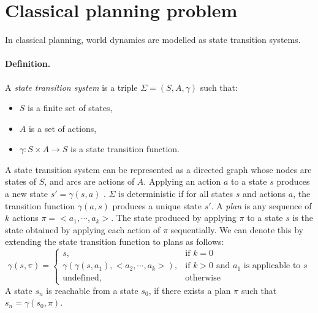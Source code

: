 \section{Classical planning problem}\label{subsec:Classical planning problem}
In classical planning, world dynamics are modelled as state transition systems.

\paragraph{Definition.}
A \textit{state transition system} is a triple $\Sigma = (S, A, \gamma)$ such that:
\begin{itemize}
\item $S$ is a finite set of states,
\item $A$ is a set of actions,
\item $\gamma : S \times A \rightarrow S$ is a state transition function.
\end{itemize}

\noindent A state transition system can be represented as a directed graph whose nodes are states of $S$, and arcs are actions of $A$. 
Applying an action $a$ to a state $s$ produces a new state $s'= \gamma(s,a)$ 
. 
$\Sigma$ is deterministic if for all states $s$ and actions $a$, the transition function $\gamma(a, s)$ produces a unique state $s'$. 
A \textit{plan} is any sequence of $k$ actions $\pi = <a_1,\cdots, a_k>$. The state produced by applying $\pi$ to a state $s$ is the state obtained by applying each action of $\pi$ sequentially. 
We can denote this by extending the state transition function to plans as follows:
\[\gamma(s,\pi)=\left\{
\begin{array}{ll}
   s, &\mbox{if $k=0$} \\
   \gamma(\gamma(s,a_1),<a_2,\cdots, a_k>), &\mbox{if $k>0$ and $a_1$ is applicable to $s$} \\
   \mbox{undefined}, &\mbox{otherwise}
\end{array}
\right.
\]
A state $s_n$ is reachable from a state $s_0$, if there exists a plan $\pi$ such that $s_{n} = \gamma(s_0, \pi)$.\\


